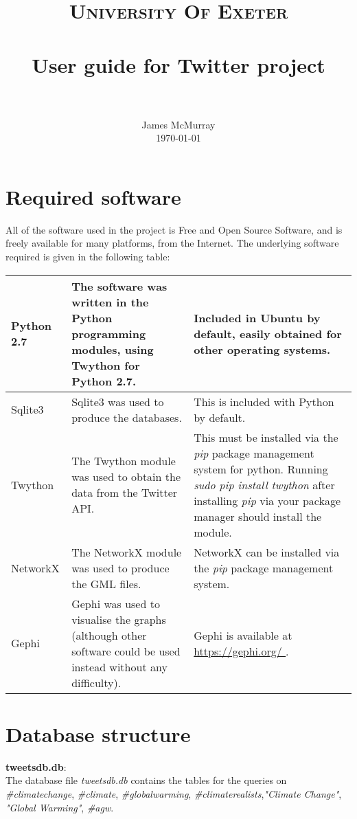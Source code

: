 \documentclass[paper=a4, fontsize=11pt]{scrartcl}
\title{
		\usefont{OT1}{bch}{b}{n}
		\normalfont \normalsize \textsc{University Of Exeter} \\ [25pt]
		\horrule{0.5pt} \\[0.4cm]
		\huge User guide for Twitter project\\
		\horrule{2pt} \\[0.5cm]
}
\author{
		\normalfont 								\normalsize
        James McMurray\\[-3pt]		\normalsize
        \today
}
\date{}
\numberwithin{equation}{section}		%
\numberwithin{figure}{section}			%
\numberwithin{table}{section}				%
\begin{document}
\maketitle
\section{Required software}

All of the software used in the project is Free and Open Source Software, and is freely available for many platforms, from the Internet. The underlying software required is given in the following table:\\

\begin{center}
\begin{tabular}{| l | p{5cm} | p{7cm}|}
\hline
Python 2.7 & The software was written in the Python programming modules, using Twython for Python 2.7. &Included in Ubuntu by default, easily obtained for other operating systems.\\ \hline

Sqlite3 & Sqlite3 was used to produce the databases. &This is included with Python by default.\\
\hline
Twython & The Twython module was used to obtain the data from the Twitter API. & This must be installed via the \emph{pip} package management system for python. Running \emph{sudo pip install twython} after installing \emph{pip} via your package manager should install the module.\\ \hline
NetworkX & The NetworkX module was used to produce the GML files. & NetworkX can be installed via the \emph{pip} package management system.\\ \hline
Gephi & Gephi was used to visualise the graphs (although other software could be used instead without any difficulty). & Gephi is available at \url{https://gephi.org/ }.\\ \hline
\end{tabular}

\end{center}
\section{Database structure}
{\bf tweetsdb.db}:\\

The database file \emph{tweetsdb.db} contains the tables for the queries on \emph{\#climatechange}, \emph{\#climate}, \emph{\#globalwarming}, \emph{\#climaterealists},\emph{"Climate Change"}, \emph{"Global Warming"}, \emph{\#agw}.\\
\end{document}
